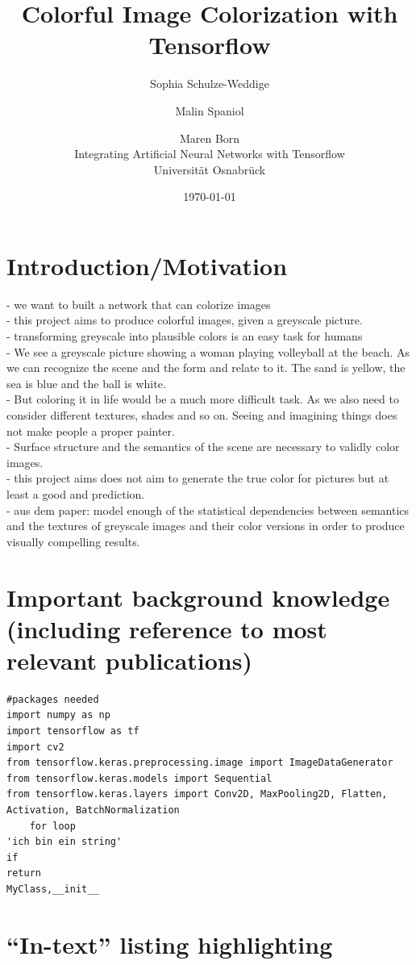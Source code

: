 \documentclass[12pt,letterpaper]{article}
\title{Colorful Image Colorization with Tensorflow}
\date{\today}
\author{Sophia Schulze-Weddige \and Malin Spaniol \and Maren Born \\Integrating Artificial Neural Networks with Tensorflow \\Universität Osnabrück}
\begin{document}
\maketitle
\thispagestyle{empty}

\section{Introduction/Motivation}
- we want to built a network that can colorize images\\
- this project aims to produce colorful images, given a greyscale picture.\\
- transforming greyscale into plausible colors is an easy task for humans\\
- We see a greyscale picture showing a woman playing volleyball at the beach. As we can recognize the scene and the form and relate to it. The sand is yellow, the sea is blue and the ball is white.\\
- But coloring it in life would be a much more difficult task. As we also need to consider different textures, shades and so on. Seeing and imagining things does not make people a proper painter.\\
- Surface structure and the semantics of the scene are necessary to validly color images.\\
- this project aims does not aim to generate the true color for pictures but at least a good and prediction.\\
- aus dem paper: model enough of the statistical dependencies between semantics and the textures of greyscale images and their color versions in order to produce visually compelling results.\\

\section{Important background knowledge (including reference to most relevant publications)}
\begin{lstlisting}
#packages needed
import numpy as np 
import tensorflow as tf 
import cv2
from tensorflow.keras.preprocessing.image import ImageDataGenerator
from tensorflow.keras.models import Sequential
from tensorflow.keras.layers import Conv2D, MaxPooling2D, Flatten, Activation, BatchNormalization
	for loop
'ich bin ein string'
if
return
MyClass,__init__
\end{lstlisting}

\section{``In-text'' listing highlighting}
\end{document}
